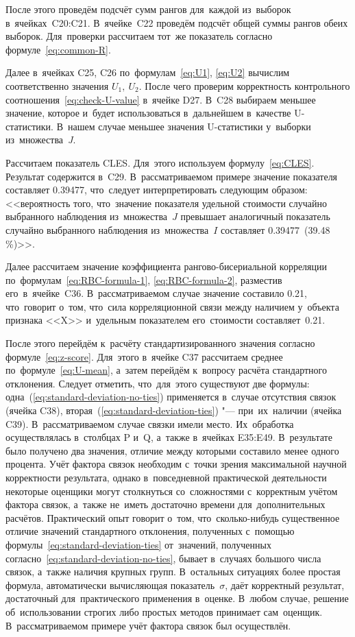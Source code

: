 \documentclass[]{scrreprt}
\begin{document}
После этого проведём подсчёт сумм рангов для~каждой из~выборок в~ячейках~C20:C21. В~ячейке~C22 проведём подсчёт общей суммы рангов обеих выборок. Для~проверки рассчитаем тот~же показатель согласно формуле~\ref{eq:common-R}.

Далее в~ячейках C25, C26 по~формулам~\ref{eq:U1}, \ref{eq:U2} вычислим соответственно значения ${\textstyle U_1,\ U_{2}}$. После чего проверим корректность контрольного соотношения~\ref{eq:check-U-value} в~ячейке D27. В~C28 выбираем меньшее значение, которое и~будет использоваться в~дальнейшем в~качестве U-статистики. В~нашем случае меньшее значения U-статистики у~выборки из~множества~\textit{J}.

Рассчитаем показатель CLES. Для~этого используем формулу~\ref{eq:CLES}. Результат содержится в~C29. В~рассматриваемом примере значение показателя составляет 0.39477, что~следует интерпретировать следующим образом: <<вероятность того, что~значение показателя удельной стоимости случайно выбранного наблюдения из~множества~$J$ превышает аналогичный показатель случайно выбранного наблюдения из~множества~$I$ составляет 0.39477~(39.48\,\%)>>.

Далее рассчитаем значение коэффициента рангово-бисериальной корреляции по~формулам~\ref{eq:RBC-formula-1}, \ref{eq:RBC-formula-2}, разместив его~в~ячейке~C36. В~рассматриваемом случае значение составило 0.21, что~говорит о~том, что~сила корреляционной связи между наличием у~объекта признака <<X>> и~удельным показателем его~стоимости составляет~0.21.

После этого перейдём к~расчёту стандартизированного значения согласно формуле~\ref{eq:z-score}. Для~этого в~ячейке C37 рассчитаем среднее по~формуле~\ref{eq:U-mean}, а~затем перейдём к~вопросу расчёта стандартного отклонения. Следует отметить, что~для~этого существуют две формулы: одна~(\ref{eq:standard-deviation-no-ties}) применяется в~случае отсутствия связок (ячейка C38), вторая~(\ref{eq:standard-deviation-ties}) "--- при~их~наличии (ячейка C39). В~рассматриваемом случае связки имели место. Их~обработка осуществлялась в~столбцах P и~Q, а~также в~ячейках E35:E49. В~результате было получено два значения, отличие между которыми составило менее одного процента. Учёт фактора связок необходим с~точки зрения максимальной научной корректности результата, однако в~повседневной практической деятельности некоторые оценщики могут столкнуться со~сложностями с~корректным учётом фактора связок, а~также не~иметь достаточно времени для~дополнительных расчётов. Практический опыт говорит о~том, что~сколько-нибудь существенное отличие значений стандартного отклонения, полученных с~помощью формулы~\ref{eq:standard-deviation-ties} от~значений, полученных согласно~\ref{eq:standard-deviation-no-ties}, бывает в~случаях большого числа связок, а~также наличия крупных групп. В~остальных ситуациях более простая формула, автоматически вычисляющая показатель~${\textstyle \sigma}$, даёт корректный результат, достаточный для~практического применения в~оценке. В~любом случае, решение об~использовании строгих либо простых методов принимает сам~оценщик. В~рассматриваемом примере учёт фактора связок был осуществлён. 
\end{document}

